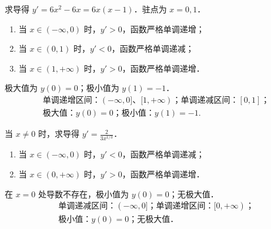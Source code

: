 \begin{solution}

    求导得 $y' = 6x^2 - 6x = 6x(x - 1)$．驻点为 $x = 0, 1$．
    \begin{enumerate}
        \item 当 $x \in (-\infty, 0)$ 时，$y' > 0$，函数严格单调递增；
        \item 当 $x \in (0, 1)$ 时，$y' < 0$，函数严格单调递减；
        \item 当 $x \in (1, +\infty)$ 时，$y' > 0$，函数严格单调递增．
    \end{enumerate}
    极大值为 $y(0) = 0$；极小值为 $y(1) = -1$．
    \begin{equation}
        \boxed{
        \begin{aligned}
             & \text{单调递增区间：} (-\infty, 0]\text{、}[1, +\infty)\text{；单调递减区间：} [0, 1]\text{；} \\
             & \text{极大值：} y(0) = 0\text{；极小值：} y(1) = -1.
        \end{aligned}
        }
    \end{equation}


    当 $x \neq 0$ 时，求导得 $y' = \frac{2}{3x^{1/3}}$．
    \begin{enumerate}
        \item 当 $x \in (-\infty, 0)$ 时，$y' < 0$，函数严格单调递减；
        \item 当 $x \in (0, +\infty)$ 时，$y' > 0$，函数严格单调递增．
    \end{enumerate}
    在 $x = 0$ 处导数不存在，极小值为 $y(0) = 0$；无极大值．
    \begin{equation}
        \boxed{
        \begin{aligned}
             & \text{单调递减区间：} (-\infty, 0]\text{；单调递增区间：} [0, +\infty)\text{；} \\
             & \text{极小值：} y(0) = 0\text{；无极大值．}
        \end{aligned}
        }
    \end{equation}



\end{solution}
